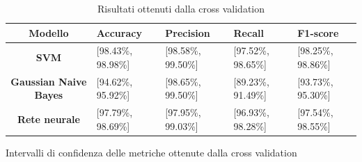 \begin{table}[!ht]
\begin{subtable}[h]{1\textwidth}
\begin{tabular}{@{}cllll@{}}
            \rowcolor[HTML]{EFEFEF}
            \textbf{Modello}                                      & \textbf{Accuracy}  & \textbf{Precision} & \textbf{Recall}    & \textbf{F1-score}  \\ \midrule
            \cellcolor[HTML]{EFEFEF}\textbf{SVM}                  & [98.43\%, 98.98\%] & [98.58\%, 99.50\%] & [97.52\%, 98.65\%] & [98.25\%, 98.86\%] \\
            \cellcolor[HTML]{EFEFEF}\textbf{Gaussian Naive Bayes} & [94.62\%, 95.92\%] & [98.65\%, 99.50\%] & [89.23\%, 91.49\%] & [93.73\%, 95.30\%] \\
            \cellcolor[HTML]{EFEFEF}\textbf{Rete neurale}         & [97.79\%, 98.69\%] & [97.95\%, 99.03\%] & [96.93\%, 98.28\%] & [97.54\%, 98.55\%] \\ \bottomrule
        \end{tabular}
        \caption{Intervalli di confidenza delle metriche ottenute dalla cross validation}
        \label{tab:intervalli_confidenza_corr}
    \end{subtable}
    \caption{Risultati ottenuti dalla cross validation}
    \label{tab:metriche_intervalli_confidenza_corr}
\end{table}

